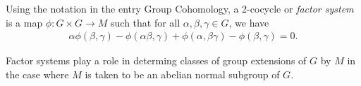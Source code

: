 \documentclass[12pt]{article}
\newcommand{\ra}{\rightarrow}
\newcommand{\<}{\langle}
\renewcommand{\>}{\rangle}
\begin{document}
Using the notation in the entry Group Cohomology, a 2-cocycle or \emph{factor system} is a map $\phi:G\times G\ra M$ such that for all $\alpha,\beta,\gamma\in G$, we have
\begin{align*}
\alpha\phi(\beta,\gamma)-\phi(\alpha\beta,\gamma)+\phi(\alpha,\beta\gamma)-\phi(\beta,\gamma)=0.
\end{align*}

Factor systems play a role in determing classes of group extensions of $G$ by $M$ in the case where $M$ is taken to be an abelian normal subgroup of $G$.
\end{document}
